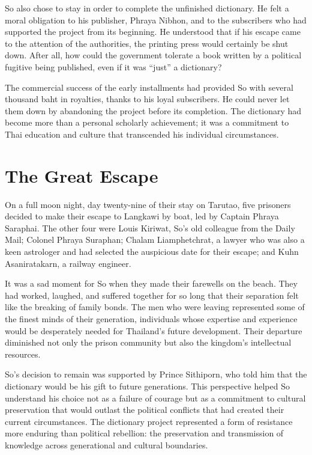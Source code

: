 \documentclass[
  Letterpaper,
]{scrbook}
\begin{document}
So also chose to stay in order to complete the unfinished dictionary. He
felt a moral obligation to his publisher, Phraya Nibhon, and to the
subscribers who had supported the project from its beginning. He
understood that if his escape came to the attention of the authorities,
the printing press would certainly be shut down. After all, how could
the government tolerate a book written by a political fugitive being
published, even if it was ``just'' a dictionary?

The commercial success of the early installments had provided So with
several thousand baht in royalties, thanks to his loyal subscribers. He
could never let them down by abandoning the project before its
completion. The dictionary had become more than a personal scholarly
achievement; it was a commitment to Thai education and culture that
transcended his individual circumstances.

\section{The Great Escape}\label{the-great-escape}

On a full moon night, day twenty-nine of their stay on Tarutao, five
prisoners decided to make their escape to Langkawi by boat, led by
Captain Phraya Saraphai. The other four were Louis Kiriwat, So's old
colleague from the Daily Mail; Colonel Phraya Suraphan; Chalam
Liamphetchrat, a lawyer who was also a keen astrologer and had selected
the auspicious date for their escape; and Kuhn Asaniratakarn, a railway
engineer.

It was a sad moment for So when they made their farewells on the beach.
They had worked, laughed, and suffered together for so long that their
separation felt like the breaking of family bonds. The men who were
leaving represented some of the finest minds of their generation,
individuals whose expertise and experience would be desperately needed
for Thailand's future development. Their departure diminished not only
the prison community but also the kingdom's intellectual resources.

So's decision to remain was supported by Prince Sithiporn, who told him
that the dictionary would be his gift to future generations. This
perspective helped So understand his choice not as a failure of courage
but as a commitment to cultural preservation that would outlast the
political conflicts that had created their current circumstances. The
dictionary project represented a form of resistance more enduring than
political rebellion: the preservation and transmission of knowledge
across generational and cultural boundaries.
\end{document}
